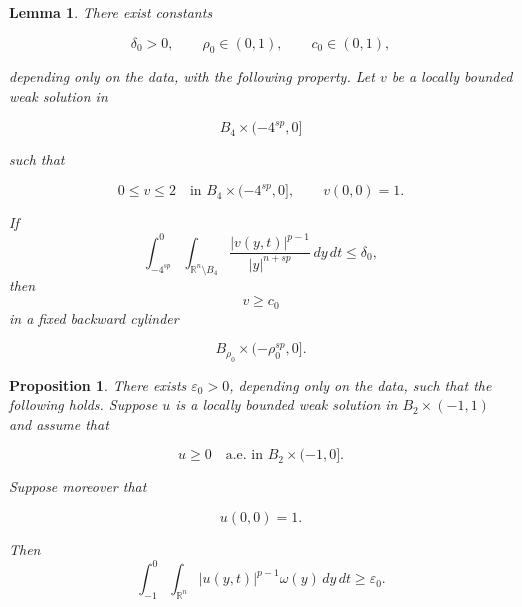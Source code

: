 \documentclass[10pt,a4paper]{amsart}
\newtheorem{lemma}{Lemma}
\newtheorem{proposition}{Proposition}
\newcommand{\R}{\mathbb R}
\begin{document}
\begin{lemma}\label{lem:continuity}
There exist constants

\[
    \delta_0>0,
    \qquad
    \rho_0\in(0,1),
    \qquad
    c_0\in(0,1),
\]

depending only on the data, with the following property. Let $v$ be a locally
bounded weak solution in

\[
    B_4\times(-4^{sp},0]
\]

such that

\[
    0\le v\le2
    \quad\text{in }B_4\times(-4^{sp},0],
    \qquad
    v(0,0)=1.
\]

If
\begin{equation}\label{eq:normalized-tail-small}
\int_{-4^{sp}}^0
\int_{\R^n\setminus B_4}
\frac{|v(y,t)|^{p-1}}{|y|^{n+sp}}\,dy\,dt
\le\delta_0,
\end{equation}
then
\begin{equation}\label{eq:normalized-positive}
v\ge c_0
\end{equation}
in a fixed backward cylinder

\[
    B_{\rho_0}\times(-\rho_0^{sp},0].
\]

\end{lemma}

\begin{proposition}\label{prop:moment}
There exists $\varepsilon_0>0$, depending only on the data, such that the
following holds. Suppose $u$ is a locally bounded weak solution in
$B_2\times(-1,1)$ and assume that

\[
    u\ge0
    \quad\text{a.e. in }B_2\times(-1,0].
\]

Suppose moreover that

\[
    u(0,0)=1.
\]

Then
\begin{equation}\label{eq:absolute-moment}
\int_{-1}^0
\int_{\R^n}
|u(y,t)|^{p-1}\omega(y)\,dy\,dt
\ge\varepsilon_0.
\end{equation}
\end{proposition}
\end{document}
